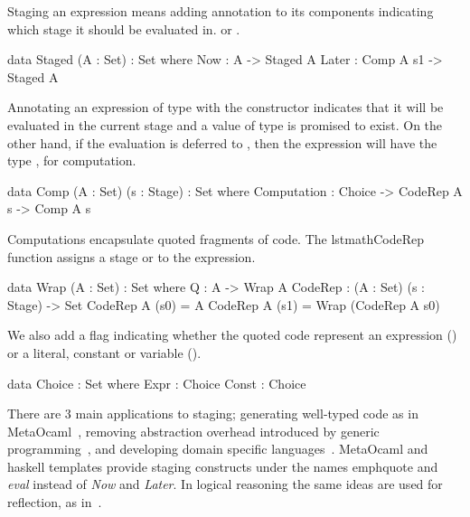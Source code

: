 Staging an expression means adding annotation to its components indicating which stage it should be evaluated in. 
 or . 
\begin{togcode} 
data Staged (A : Set) : Set where
  Now : A -> Staged A
  Later : Comp A s1 -> Staged A
\end{togcode} 
Annotating an expression of type  with the  constructor indicates that it will be evaluated in the current stage and a value of type  is promised to exist. On the other hand, if the evaluation is deferred to , then the expression will have the type , for computation. 
\begin{togcode} 
data Comp (A : Set) (s : Stage) : Set where
  Computation : Choice -> CodeRep A s -> Comp A s
\end{togcode} 
Computations encapsulate quoted fragments of code. The lstmath{CodeRep} function assigns a stage  or  to the expression. 
\begin{togcode} 
data Wrap (A : Set) : Set where
  Q : A -> Wrap A
CodeRep : (A : Set) (s : Stage) -> Set
  CodeRep A (s0) = A
  CodeRep A (s1) = Wrap (CodeRep A s0)
\end{togcode} 
We also add a flag indicating whether the quoted code represent an expression () or a literal, constant or variable ().  
\begin{togcode} 
data Choice : Set where
  Expr : Choice
  Const : Choice
\end{togcode} 

There are $3$ main applications to staging; generating well-typed code as in MetaOcaml~\cite{taha1999multi}, removing abstraction overhead introduced by generic programming~\cite{yallop2016StagingGeneric}, and developing domain specific languages~\cite{sheard2000stagingDSL}. MetaOcaml and haskell templates provide staging constructs under the names emph{quote} and \emph{eval} instead of \emph{Now} and \emph{Later}. In logical reasoning the same ideas are used for reflection, as in~\cite{farmer2013quoteEval}. 


